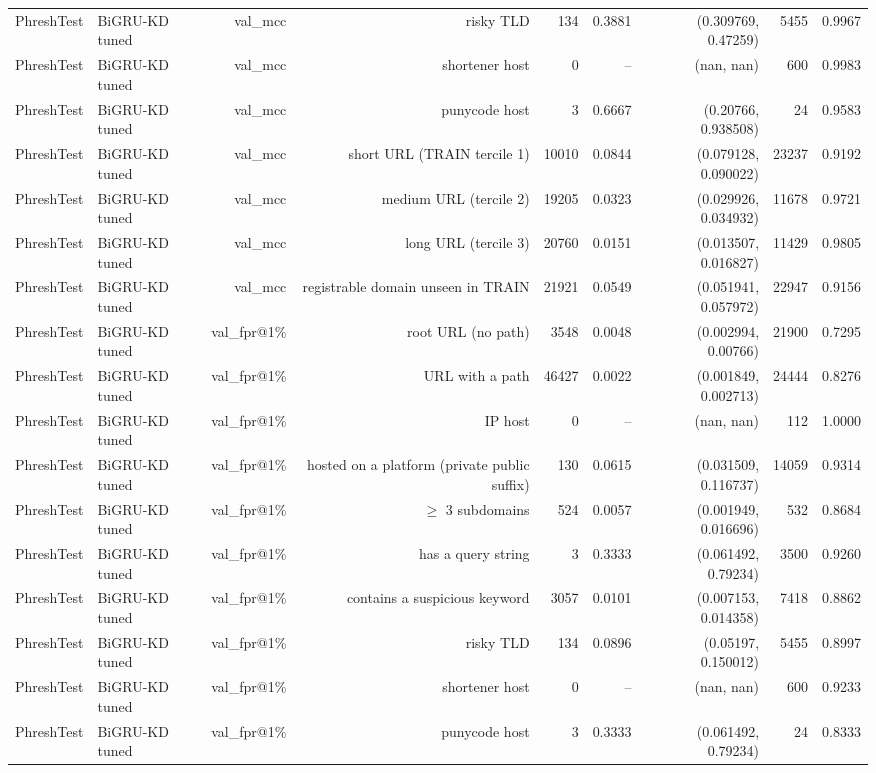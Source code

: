 \begin{table}[t]
\begin{tabular}{llrrrrrrr}
PhreshTest & BiGRU-KD tuned & val\_mcc & risky TLD & 134 & 0.3881 & (0.309769, 0.47259) & 5455 & 0.9967 \\
PhreshTest & BiGRU-KD tuned & val\_mcc & shortener host & 0 & -- & (nan, nan) & 600 & 0.9983 \\
PhreshTest & BiGRU-KD tuned & val\_mcc & punycode host & 3 & 0.6667 & (0.20766, 0.938508) & 24 & 0.9583 \\
PhreshTest & BiGRU-KD tuned & val\_mcc & short URL (TRAIN tercile 1) & 10010 & 0.0844 & (0.079128, 0.090022) & 23237 & 0.9192 \\
PhreshTest & BiGRU-KD tuned & val\_mcc & medium URL (tercile 2) & 19205 & 0.0323 & (0.029926, 0.034932) & 11678 & 0.9721 \\
PhreshTest & BiGRU-KD tuned & val\_mcc & long URL (tercile 3) & 20760 & 0.0151 & (0.013507, 0.016827) & 11429 & 0.9805 \\
PhreshTest & BiGRU-KD tuned & val\_mcc & registrable domain unseen in TRAIN & 21921 & 0.0549 & (0.051941, 0.057972) & 22947 & 0.9156 \\
PhreshTest & BiGRU-KD tuned & val\_fpr@1\% & root URL (no path) & 3548 & 0.0048 & (0.002994, 0.00766) & 21900 & 0.7295 \\
PhreshTest & BiGRU-KD tuned & val\_fpr@1\% & URL with a path & 46427 & 0.0022 & (0.001849, 0.002713) & 24444 & 0.8276 \\
PhreshTest & BiGRU-KD tuned & val\_fpr@1\% & IP host & 0 & -- & (nan, nan) & 112 & 1.0000 \\
PhreshTest & BiGRU-KD tuned & val\_fpr@1\% & hosted on a platform (private public suffix) & 130 & 0.0615 & (0.031509, 0.116737) & 14059 & 0.9314 \\
PhreshTest & BiGRU-KD tuned & val\_fpr@1\% & $\geq$ 3 subdomains & 524 & 0.0057 & (0.001949, 0.016696) & 532 & 0.8684 \\
PhreshTest & BiGRU-KD tuned & val\_fpr@1\% & has a query string & 3 & 0.3333 & (0.061492, 0.79234) & 3500 & 0.9260 \\
PhreshTest & BiGRU-KD tuned & val\_fpr@1\% & contains a suspicious keyword & 3057 & 0.0101 & (0.007153, 0.014358) & 7418 & 0.8862 \\
PhreshTest & BiGRU-KD tuned & val\_fpr@1\% & risky TLD & 134 & 0.0896 & (0.05197, 0.150012) & 5455 & 0.8997 \\
PhreshTest & BiGRU-KD tuned & val\_fpr@1\% & shortener host & 0 & -- & (nan, nan) & 600 & 0.9233 \\
PhreshTest & BiGRU-KD tuned & val\_fpr@1\% & punycode host & 3 & 0.3333 & (0.061492, 0.79234) & 24 & 0.8333 \\

\end{tabular}
\end{table}

